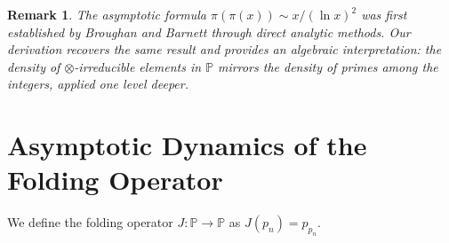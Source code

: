\documentclass[11pt, a4paper]{article}
\newtheorem{remark}{Remark}
\begin{document}
\begin{remark}
The asymptotic formula $\pi(\pi(x)) \sim x / (\ln x)^2$ was first established by Broughan and Barnett \cite{broughan} through direct analytic methods. Our derivation recovers the same result and provides an algebraic interpretation: the density of $\otimes$-irreducible elements in $\mathbb{P}$ mirrors the density of primes among the integers, applied one level deeper.
\end{remark}

\section{Asymptotic Dynamics of the Folding Operator}\label{sec:asymp}

We define the folding operator $J: \mathbb{P} \to \mathbb{P}$ as $J(p_n) = p_{p_n}$.
\end{document}
